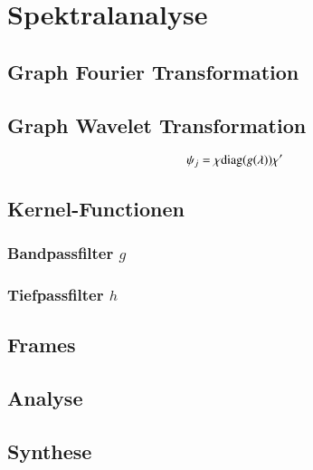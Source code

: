 
\section{Spektralanalyse}

\subsection{Graph Fourier Transformation\label{subsec:sgwt:gft}}

\subsection{Graph Wavelet Transformation\label{subsec:sgwt:gwt}}

\begin{equation}
\psi_j = \chi \diag{g(\lambda)} \chi'
\end{equation}

\subsection{Kernel-Functionen}

\subsubsection{Bandpassfilter \texorpdfstring{$g$}{g}}

\subsubsection{Tiefpassfilter \texorpdfstring{$h$}{h}}

\subsection{Frames}

\subsection{Analyse}

\subsection{Synthese}
